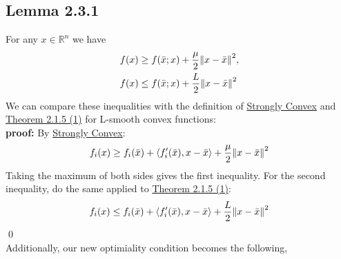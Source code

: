 \documentclass[12pt,a4paper]{article}
\begin{document}
	 \subsection*{Lemma 2.3.1}\label{lem231}
	 For any $x \in \mathbb{R}^n$ we have
	 \begin{align}
	 	&f(x) \geq f(\bar{x};x) + \frac{\mu}{2}\norm{x - \bar{x}}^2, \\
	 	&f(x) \leq f(\bar{x};x) + \frac{L}{2}\norm{x - \bar{x}}^2
	 \end{align}
	 We can compare these inequalities with the definition of \hyperref[sec:Def]{Strongly Convex} and \hyperref[thm215_1]{Theorem 2.1.5 (1)} for L-smooth convex functions:\\
	 \textbf{proof:} By \hyperref[sec:Def]{Strongly Convex}:
	 \begin{align*}
	 	f_i(x) \geq f_i(\bar{x}) + \langle f_i'(\bar{x}), x - \bar{x} \rangle + \frac{\mu}{2}\norm{x - \bar{x}}^2
	 \end{align*}
	 Taking the maximum of both sides gives the first inequality. For the second inequality, do the same applied to \hyperref[thm215_1]{Theorem 2.1.5 (1)}:
	 \begin{align*}
	 	f_i(x) \leq f_i(\bar{x}) + \langle f_i'(\bar{x}), x - \bar{x} \rangle + \frac{L}{2}\norm{x - \bar{x}}^2
	 \end{align*} \qed \\
	 Additionally, our new optimiality condition becomes the following,
\end{document}
